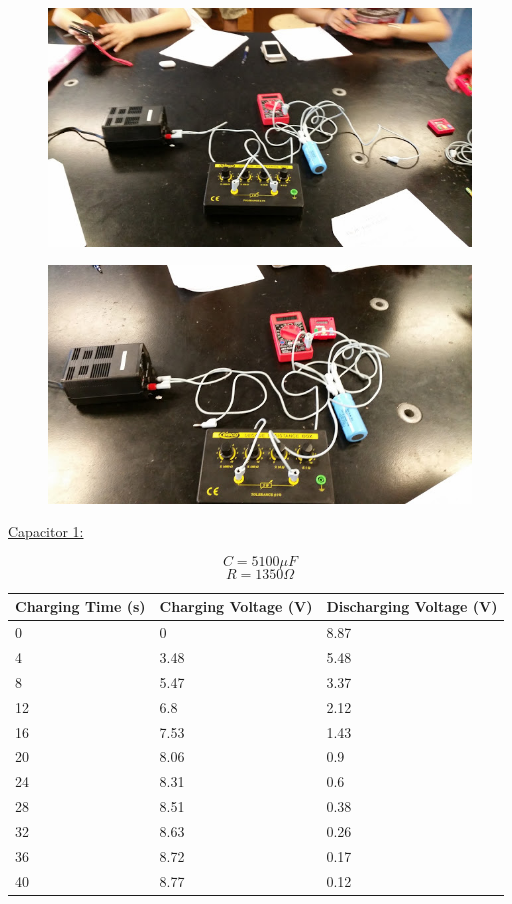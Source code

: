 \documentclass[11pt, titlepage]{article}
\begin{document}
\begin{figure}[h]
\centering
\hspace*{0cm}
\includegraphics[scale=0.12, angle=90]{lab31.jpg}
\vspace*{0cm}
\end{figure}

\begin{figure}[h]
\centering
\hspace*{0cm}
\includegraphics[scale=0.12, angle=270]{lab32.jpg}
\vspace*{0cm}
\end{figure}

\underline{Capacitor 1:}
\begin{center}
$$C = 5100 \mu F$$
$$R = 1350 \Omega$$
\begin{tabular}
{|m{9em}|m{9em}|m{9em}|}
\hline
Charging Time (s) & Charging Voltage (V) & Discharging Voltage (V) \\
\hline
0 & 0 & 8.87\\
\hline
4 & 3.48 & 5.48\\
\hline
8 & 5.47 & 3.37\\
\hline
12 & 6.8 & 2.12\\
\hline
16 & 7.53 & 1.43\\
\hline
20 & 8.06 & 0.9\\
\hline
24 & 8.31 & 0.6\\
\hline
28 & 8.51 & 0.38\\
\hline
32 & 8.63 & 0.26\\
\hline
36 & 8.72 & 0.17\\
\hline
40 & 8.77 & 0.12\\
\hline
\end{tabular}
\end{center}
\end{document}

